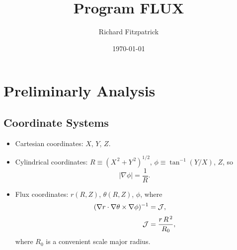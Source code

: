 \documentclass[12pt]{article}
\title{\bf Program FLUX}
\date{\today}
\author{Richard Fitzpatrick}
\begin{document}
\maketitle

\section{Preliminarly Analysis}
\subsection{Coordinate Systems}
\begin{itemize}
\item Cartesian coordinates: $X$, $Y$, $Z$.
\item Cylindrical coordinates: $R\equiv (X^{\,2}+Y^{\,2})^{1/2}$, $\phi\equiv \tan^{-1}(Y/X)$, $Z$,
so
\begin{equation}
|\nabla\phi| = \frac{1}{R}.
\end{equation}
\item Flux coordinates: $r(R,Z)$, $\theta(R,Z)$, $\phi$, where
\begin{align}\label{e1}
(\nabla r\cdot\nabla\theta\times \nabla\phi)^{-1} &= {\cal J},\\[0.5ex]
{\cal J} &=\frac{r\,R^{\,2}}{R_0},\label{e2}
\end{align}
where $R_0$ is a convenient scale major radius.
\end{itemize}
\end{document}
